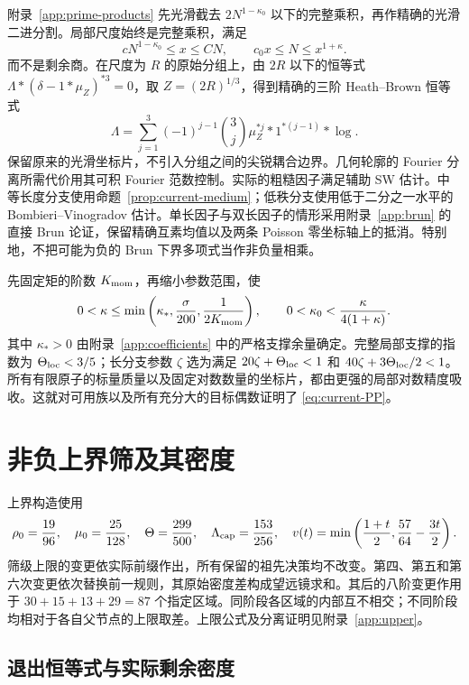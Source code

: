 附录~\ref{app:prime-products} 先光滑截去 $2N^{1-\kappa_0}$ 以下的完整乘积，再作精确的光滑二进分割。局部尺度始终是完整乘积，满足
\[
 cN^{1-\kappa_0}\le x\le CN,\qquad
 c_0x\le N\le x^{1+\kappa}.
\]
而不是剩余商。在尺度为 $R$ 的原始分组上，由 $2R$ 以下的恒等式 $\Lambda*(\delta-1*\mu_Z)^{*3}=0$，取 $Z=(2R)^{1/3}$，得到精确的三阶 Heath--Brown 恒等式
\begin{equation}
 \Lambda=\sum_{j=1}^3(-1)^{j-1}\binom3j
                 \mu_Z^{*j}*1^{*(j-1)}*\log.
 \label{eq:current-HB}
\end{equation}
保留原来的光滑坐标片，不引入分组之间的尖锐耦合边界。几何轮廓的 Fourier 分离所需代价用其可积 Fourier 范数控制。实际的粗糙因子满足辅助 SW 估计。中等长度分支使用命题~\ref{prop:current-medium}；低秩分支使用低于二分之一水平的 Bombieri--Vinogradov 估计。单长因子与双长因子的情形采用附录~\ref{app:brun} 的直接 Brun 论证，保留精确互素均值以及两条 Poisson 零坐标轴上的抵消。特别地，不把可能为负的 Brun 下界多项式当作非负量相乘。

先固定矩的阶数 $K_{\rm mom}$，再缩小参数范围，使
\[
 0<\kappa\le\min\left(\kappa_*,\frac{\sigma}{200},
                           \frac1{2K_{\rm mom}}\right),\qquad
 0<\kappa_0<\frac{\kappa}{4(1+\kappa)}.
\]
其中 $\kappa_*>0$ 由附录~\ref{app:coefficients} 中的严格支撑余量确定。完整局部支撑的指数为 $\Theta_{\rm loc}<3/5$；长分支参数 $\zeta$ 选为满足 $20\zeta+\Theta_{\rm loc}<1$ 和 $40\zeta+3\Theta_{\rm loc}/2<1$。所有有限原子的标量质量以及固定对数数量的坐标片，都由更强的局部对数精度吸收。这就对可用族以及所有充分大的目标偶数证明了 \eqref{eq:current-PP}。

\section{非负上界筛及其密度}
\label{sec:current-upper}

上界构造使用
\[
 \rho_0=\frac{19}{96},\quad \mu_0=\frac{25}{128},\quad
 \Theta=\frac{299}{500},\quad \Lambda_{\rm cap}=\frac{153}{256},\quad
 v(t)=\min\left(\frac{1+t}{2},\frac{57}{64}-\frac{3t}{2}\right).
\]
筛级上限的变更依实际前缀作出，所有保留的祖先决策均不改变。第四、第五和第六次变更依次替换前一规则，其原始密度差构成望远镜求和。其后的八阶变更作用于 $30+15+13+29=87$ 个指定区域。同阶段各区域的内部互不相交；不同阶段均相对于各自父节点的上限取差。上限公式及分离证明见附录~\ref{app:upper}。

\subsection{退出恒等式与实际剩余密度}

